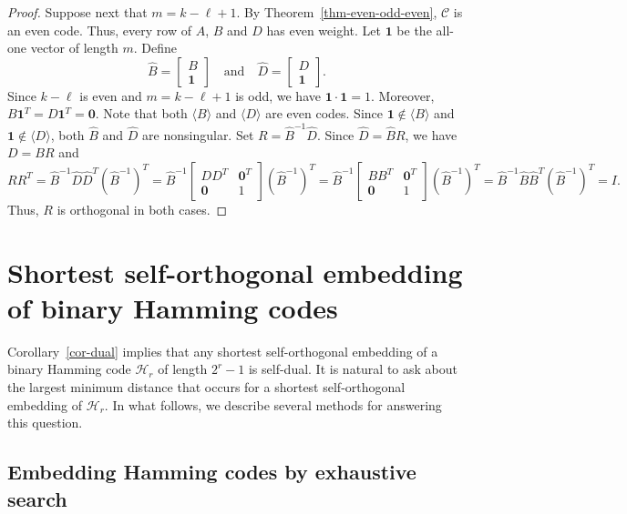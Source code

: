 \documentclass{article}
\theoremstyle{definition}
\theoremstyle{remark}
\begin{document}
\begin{proof}
    Suppose next that $m=k-\ell+1$. By Theorem~\ref{thm-even-odd-even}, $\mathcal{C}$ is an even code. Thus, every row of $A$, $B$ and $D$ has even weight. Let $\mathbf{1}$ be the all-one vector of length $m$. Define
    \[
    \hat{B}=\begin{bmatrix}
        B\\\mathbf{1}
    \end{bmatrix}\quad\mbox{and}\quad\hat{D}=\begin{bmatrix}
        D\\\mathbf{1}
    \end{bmatrix}.
    \]
    Since $k-\ell$ is even and $m=k-\ell+1$ is odd, we have $\mathbf{1}\cdot\mathbf{1}=1$. Moreover, $B\mathbf{1}^T=D\mathbf{1}^T=\mathbf{0}$. Note that both $\langle B\rangle$ and $\langle D\rangle$ are even codes. Since $\mathbf{1}\notin\langle B\rangle$ and $\mathbf{1}\notin\langle D\rangle$, both $\hat{B}$ and $\hat{D}$ are nonsingular. Set $R=\hat{B}^{-1}\hat{D}$. Since $\hat{D}=\hat{B}R$, we have $D=BR$ and
    \[
    RR^T=\hat{B}^{-1}\hat{D}\hat{D}^T(\hat{B}^{-1})^T=\hat{B}^{-1}\begin{bmatrix}
        DD^T & \mathbf{0}^T\\\mathbf{0} & 1
    \end{bmatrix}(\hat{B}^{-1})^T=
    \hat{B}^{-1}\begin{bmatrix}
        BB^T & \mathbf{0}^T\\\mathbf{0} & 1
    \end{bmatrix}(\hat{B}^{-1})^T
    =\hat{B}^{-1}\hat{B}\hat{B}^T(\hat{B}^{-1})^T=I.
    \]
    Thus, $R$ is orthogonal in both cases.
\end{proof}

\section{Shortest self-orthogonal embedding of binary Hamming codes}

Corollary~\ref{cor-dual} implies that any shortest self-orthogonal embedding of a binary Hamming code $\mathcal H_r$ of length $2^r -1$ is self-dual.  It is natural to ask about the largest minimum distance that occurs for a shortest self-orthogonal embedding of $\mathcal{H}_r$.  In what follows, we describe several methods for answering this question.

\subsection{Embedding Hamming codes by exhaustive search}\label{ExAlgorithm}
\end{document}
